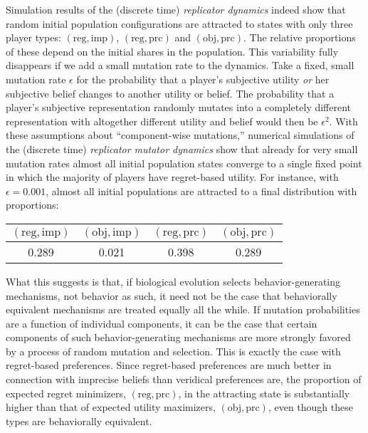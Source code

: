 \documentclass[fleqn,reqno,12pt]{article}
\theoremstyle{Satz}
\theoremstyle{Bsp}
\begin{document}
Simulation results of the (discrete time) \emph{replicator dynamics}
\citep{TaylorJonker1978:Evolutionary-St} indeed show that random initial population
configurations are attracted to states with only three player types:
$(\text{reg}, \text{imp})$, $(\text{reg}, \text{prc})$ and $(\text{obj}, \text{prc})$. The
relative proportions of these depend on the initial shares in the population. This variability fully disappears if
we add a small mutation rate to the dynamics. Take a fixed, small mutation rate $\epsilon$ for
the probability that a player's subjective utility \emph{or} her subjective belief changes to another
utility or belief. The probability that a player's subjective representation randomly mutates into a
completely different representation with altogether different utility and belief would
then be $\epsilon^2$. With these assumptions about ``component-wise mutations,'' numerical
simulations of the (discrete time) \emph{replicator mutator dynamics}
\citep{Nowak2006:Evolutionary-Dy} show that already for very small mutation rates almost all
initial population states converge to a single fixed point in which the majority of players have
regret-based utility. For instance, with $\epsilon = 0.001$, almost all initial populations are
attracted to a final distribution with proportions:

\begin{center}
  \begin{tabular}{cccc}
    $(\text{reg}, \text{imp})$ & $(\text{obj}, \text{imp})$ & $(\text{reg},
      \text{prc})$ & $(\text{obj}, \text{prc})$ \\ \hline
    0.289  & 0.021 &   0.398 &    0.289 
  \end{tabular}
\end{center}

What this suggests is that, if biological evolution selects behavior-generating mechanisms, not
behavior as such, it need not be the case that behaviorally equivalent mechanisms are treated
equally all the while. If mutation probabilities are a function of individual components, it can be the case that
certain components of such behavior-generating mechanisms are more strongly favored by a process of random mutation and
selection. This is exactly the case with regret-based preferences. Since regret-based preferences are much better in connection with imprecise
beliefs than veridical preferences are, the proportion of expected regret minimizers,
$(\text{reg}, \text{prc})$, in the attracting state is substantially higher than that of
expected utility maximizers, $(\text{obj}, \text{prc})$, even though these types are
behaviorally equivalent.
\end{document}

